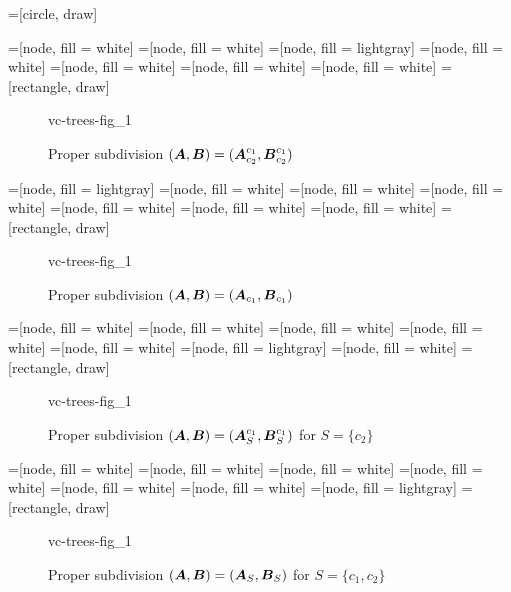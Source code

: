 
	=[circle, draw]

	=[node, fill = white]
	=[node, fill = white]
	=[node, fill = lightgray]
	=[node, fill = white]
	=[node, fill = white]
	=[node, fill = white]
	=[node, fill = white]
	=[rectangle, draw]

	\begin{figure}[p]
		 {vc-trees-fig_1}
		\caption{Proper subdivision  $(\operatorname{\boldsymbol A}, \operatorname{\boldsymbol B}) = (\operatorname{\boldsymbol A}^{c_1}_{c_2}, \operatorname{\boldsymbol B}^{c_1}_{c_2})$}
	\end{figure}
	
	=[node, fill = lightgray]
	=[node, fill = white]
	=[node, fill = white]
	=[node, fill = white]
	=[node, fill = white]
	=[node, fill = white]
	=[node, fill = white]
	=[rectangle, draw]

	\begin{figure}[p]
		 {vc-trees-fig_1}
		\caption{Proper subdivision  $(\operatorname{\boldsymbol A}, \operatorname{\boldsymbol B}) = (\operatorname{\boldsymbol A}_{c_1}, \operatorname{\boldsymbol B}_{c_1})$}
	\end{figure}

	=[node, fill = white]
	=[node, fill = white]
	=[node, fill = white]
	=[node, fill = white]
	=[node, fill = white]
	=[node, fill = lightgray]
	=[node, fill = white]
	=[rectangle, draw]

	\begin{figure}[p]
		 {vc-trees-fig_1}
		\caption{Proper subdivision  $(\operatorname{\boldsymbol A}, \operatorname{\boldsymbol B}) = (\operatorname{\boldsymbol A}^{c_1}_S, \operatorname{\boldsymbol B}^{c_1}_S)$ for $S = \{c_2\}$}
	\end{figure}

	=[node, fill = white]
	=[node, fill = white]
	=[node, fill = white]
	=[node, fill = white]
	=[node, fill = white]
	=[node, fill = white]
	=[node, fill = lightgray]
	=[rectangle, draw]

	\begin{figure}[p]
		 {vc-trees-fig_1}
		\caption{Proper subdivision  $(\operatorname{\boldsymbol A}, \operatorname{\boldsymbol B}) = (\operatorname{\boldsymbol A}_S, \operatorname{\boldsymbol B}_S)$ for $S = \{c_1, c_2\}$}
	\end{figure}
